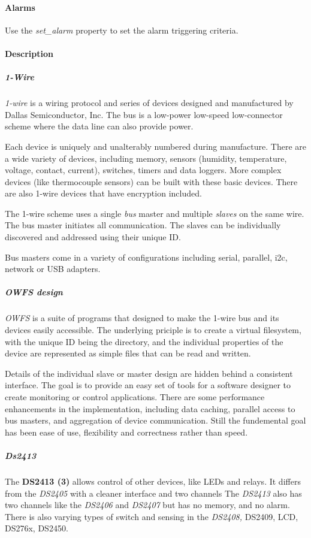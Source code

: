 \paragraph*{Alarms}
Use the \textit{set\_alarm} property to
set the alarm triggering criteria. 
\paragraph*{Description}
          
\subparagraph*{1-Wire}\textit{1-wire}  is a
wiring protocol and series of devices designed and manufactured by Dallas
Semiconductor, Inc. The bus is a low-power low-speed low-connector scheme where
the data line can also provide power. 

Each device is uniquely and unalterably
numbered during manufacture. There are a wide variety of devices, including
memory, sensors (humidity, temperature, voltage, contact, current), switches,
timers and data loggers. More complex devices (like thermocouple sensors)
can be built with these basic devices. There are also 1-wire devices that
have encryption included. 

The 1-wire scheme uses a single  \textit{bus} master and
multiple \textit{slaves} on the same wire. The bus master initiates all communication.
The slaves can be  individually discovered and addressed using their unique
ID. 

Bus masters come in a variety of configurations including serial, parallel,
i2c, network or USB adapters. 
\subparagraph*{OWFS design}\textit{OWFS} is a suite of programs that
designed to make the 1-wire bus and its devices easily accessible. The underlying
priciple is to create a virtual filesystem, with the unique ID being the
directory, and the individual properties of the device are represented
as simple files that can be read and written. 

Details of the individual
slave or master design are hidden behind a consistent interface. The goal
is to  provide an easy set of tools for a software designer to create monitoring
or control applications. There  are some performance enhancements in the
implementation, including data caching, parallel access to bus  masters,
and aggregation of device communication. Still the fundemental goal has
been ease of use, flexibility  and correctness rather than speed.  
\subparagraph*{Ds2413}The
\textsf{\textbf{DS2413 (3)}} allows control of other devices, like LEDs and relays. It differs
from the \textit{DS2405} with a cleaner interface and two channels The \textit{DS2413} also
has two channels like the \textit{DS2406} and \textit{DS2407} but has no memory, and no alarm.
There is also varying types of switch and sensing in the \textit{DS2408,} DS2409,
LCD, DS276x, DS2450. 

